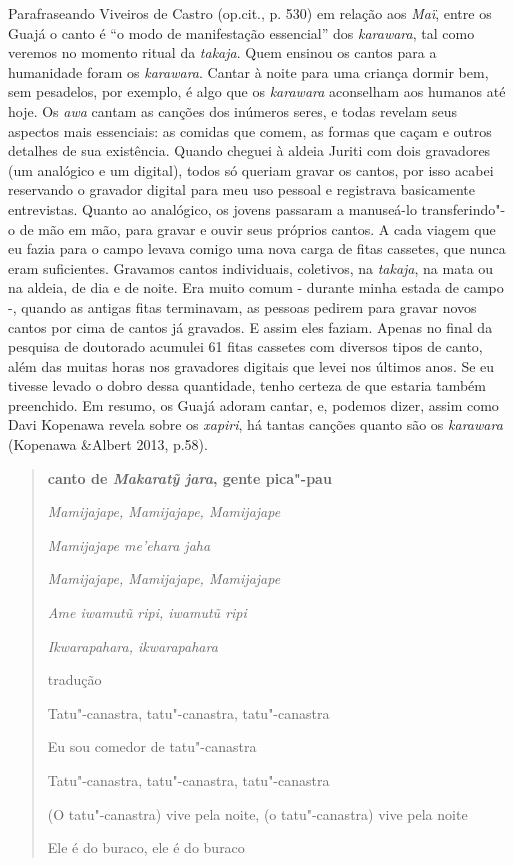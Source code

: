 Parafraseando Viveiros de Castro (op.cit., p. 530) em relação aos
\emph{Maï}, entre os Guajá o canto é ``o modo de manifestação essencial''
dos \emph{karawara}, tal como veremos no momento ritual da
\emph{takaja}. Quem ensinou os cantos para a humanidade foram os
\emph{karawara}. Cantar à noite para uma criança dormir bem, sem
pesadelos, por exemplo, é algo que os \emph{karawara} aconselham aos
humanos até hoje. Os \emph{awa} cantam as canções dos inúmeros seres, e
todas revelam seus aspectos mais essenciais: as comidas que comem, as
formas que caçam e outros detalhes de sua existência. Quando cheguei à
aldeia Juriti com dois gravadores (um analógico e um digital), todos só
queriam gravar os cantos, por isso acabei reservando o gravador digital
para meu uso pessoal e registrava basicamente entrevistas. Quanto ao
analógico, os jovens passaram a manuseá-lo transferindo"-o de mão em mão,
para gravar e ouvir seus próprios cantos. A cada viagem que eu fazia
para o campo levava comigo uma nova carga de fitas cassetes, que nunca
eram suficientes. Gravamos cantos individuais, coletivos, na
\emph{takaja}, na mata ou na aldeia, de dia e de noite. Era muito comum
- durante minha estada de campo -, quando as antigas fitas terminavam,
as pessoas pedirem para gravar novos cantos por cima de cantos já
gravados. E assim eles faziam. Apenas no final da pesquisa de doutorado
acumulei 61 fitas cassetes com diversos tipos de canto, além das muitas
horas nos gravadores digitais que levei nos últimos anos. Se eu tivesse
levado o dobro dessa quantidade, tenho certeza de que estaria também
preenchido. Em resumo, os Guajá adoram cantar, e, podemos dizer, assim
como Davi Kopenawa revela sobre os \emph{xapiri}, há tantas canções
quanto são os \emph{karawara} (Kopenawa \&Albert 2013, p.58).

\begin{quote}
\textbf{canto de \emph{Makaratỹ jara}, gente pica"-pau}

\emph{Mamijajape, Mamijajape, Mamijajape}

\emph{Mamijajape me'ehara jaha}

\emph{Mamijajape, Mamijajape, Mamijajape}

\emph{Ame iwamutũ ripi, iwamutũ ripi }

\emph{Ikwarapahara, ikwarapahara }

tradução

Tatu"-canastra, tatu"-canastra, tatu"-canastra

Eu sou comedor de tatu"-canastra

Tatu"-canastra, tatu"-canastra, tatu"-canastra

(O tatu"-canastra) vive pela noite, (o tatu"-canastra) vive pela noite

Ele é do buraco, ele é do buraco
\end{quote}

